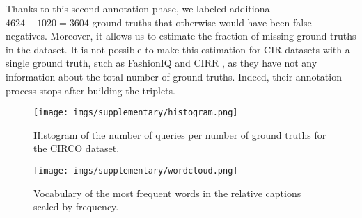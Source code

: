 \documentclass[10pt,twocolumn,letterpaper]{article}
\begin{document}
Thanks to this second annotation phase, we labeled additional $4624\!-\!1020\!=\!3604$ ground truths that otherwise would have been false negatives. Moreover, it allows us to estimate the fraction of missing ground truths in the dataset. It is not possible to make this estimation for CIR datasets with a single ground truth, such as FashionIQ \cite{wu2021fashion} and CIRR \cite{liu2021image}, as they have not any information about the total number of ground truths. Indeed, their annotation process stops after building the triplets.

  \begin{figure}
     \centering
     \texttt{[image: imgs/supplementary/histogram.png]}
     \caption{Histogram of the number of queries per number of ground truths for the CIRCO dataset.}
     \label{fig:gt_histogram}
 \end{figure}


\begin{figure}
     \centering
     \texttt{[image: imgs/supplementary/wordcloud.png]}
     \caption{Vocabulary of the most frequent words in the relative captions scaled by frequency.}
     \label{fig:wordcloud}
 \end{figure}

 

 \begin{table}
     \centering
     \Large
   \caption{Analysis of the semantic aspects covered by the relative captions. $^{\dagger}$ indicates results taken from \cite{liu2021image}. -- denotes no reported results.}
   \label{tab:caption_semantic}
 \end{table}
\end{document}

